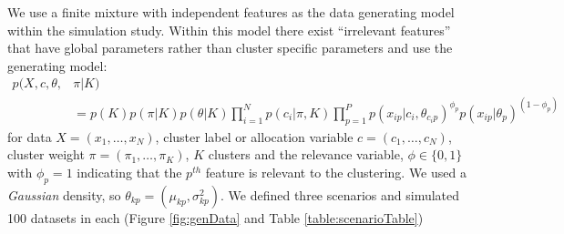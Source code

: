 \documentclass{bmcart}
\begin{document}
We use a finite mixture with independent features as the data generating model within the simulation study.
Within this model there exist ``irrelevant features'' \citep{law2003feature} that have global parameters rather than cluster specific parameters and use the generating model:
\begin{align*}
	p(X, c, \theta, & \pi| K) \\ 
	 & = p(K) p(\pi| K) p(\theta|K) \prod_{i=1}^N p (c_i | \pi, K)  \prod_{p=1}^P p(x_{ip} | c_i, \theta_{c_ip})^ {\phi_p} p(x_{ip} | \theta_p) ^ {(1 - \phi_p)}
\end{align*}
for data $X=(x_1, \ldots, x_N)$, cluster label or allocation variable $c=(c_1, \ldots, c_N)$, cluster weight $\pi=(\pi_1, \ldots, \pi_K)$, $K$ clusters and the relevance variable, $\phi \in \{0, 1\}$ with $\phi_p=1$ indicating that the $p^{th}$ feature is relevant to the clustering. We used a \emph{Gaussian} density, so $\theta_{kp} = (\mu_{kp}, \sigma^2_{kp})$. We defined three scenarios and simulated 100 datasets in each (Figure \ref{fig:genData} and Table \ref{table:scenarioTable}) 
\end{document}
